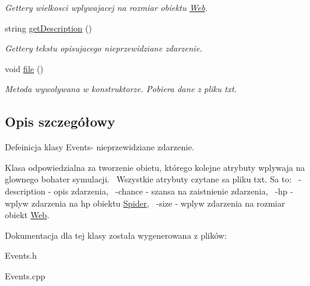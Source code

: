 \begin{DoxyCompactItemize}
\begin{DoxyCompactList}\small\item\em Gettery wielkosci wplywajacej na rozmiar obiektu \hyperlink{class_web}{Web}. \end{DoxyCompactList}\item 
string \hyperlink{class_events_a2625a228707d115a70cdbe4487b010cb}{get\+Description} ()\hypertarget{class_events_a2625a228707d115a70cdbe4487b010cb}{}\label{class_events_a2625a228707d115a70cdbe4487b010cb}

\begin{DoxyCompactList}\small\item\em Gettery tekstu opisujacego nieprzewidziane zdarzenie. \end{DoxyCompactList}\item 
void \hyperlink{class_events_a5812546955bf7873e8b4fd6435d8ccce}{file} ()\hypertarget{class_events_a5812546955bf7873e8b4fd6435d8ccce}{}\label{class_events_a5812546955bf7873e8b4fd6435d8ccce}

\begin{DoxyCompactList}\small\item\em Metoda wywolywana w konstruktorze. Pobiera dane z pliku txt. \end{DoxyCompactList}\end{DoxyCompactItemize}


\subsection{Opis szczegółowy}
Defeinicja klasy Events-\/ nieprzewidziane zdarzenie. 

Klasa odpowiedzialna za tworzenie obietu, którego kolejne atrybuty wplywaja na glownego bohater symulacji.~\newline
 Wszystkie atrybuty czytane sa pliku txt. Sa to\+:~\newline
-\/description -\/ opis zdarzenia,~\newline
-\/chance -\/ szansa na zaistnienie zdarzenia,~\newline
-\/hp -\/ wplyw zdarzenia na hp obiektu \hyperlink{class_spider}{Spider},~\newline
-\/size -\/ wplyw zdarzenia na rozmiar obiekt \hyperlink{class_web}{Web}. 

Dokumentacja dla tej klasy została wygenerowana z plików\+:\begin{DoxyCompactItemize}
\item 
Events.\+h\item 
Events.\+cpp\end{DoxyCompactItemize}
